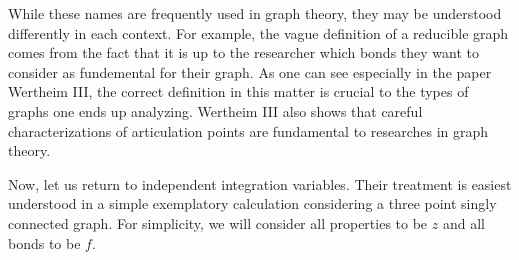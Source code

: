 \documentclass[8.5pt,twoside,twocolumn]{article}
\theoremstyle{standard}
\begin{document}
While these names are frequently used in graph theory, they may be understood differently in each context.
For example, the vague definition of a reducible graph comes from the fact that it is up to the
researcher which bonds they want to consider as fundemental for their graph. As one can see especially
in the paper Wertheim III\cite{Wertheim3}, the correct definition in this matter is crucial
to the types of graphs one ends up analyzing. Wertheim III also shows that
careful characterizations of articulation points are fundamental to researches in graph theory.

Now, let us return to independent integration variables. Their treatment is easiest understood in a simple exemplatory calculation
considering a three point singly connected graph. For simplicity, we will consider all properties to be
$z$ and all bonds to be $f$.
\end{document}
